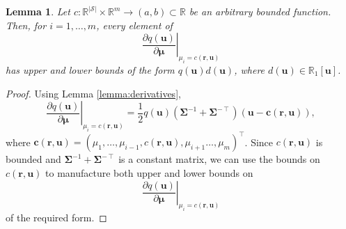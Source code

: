 \documentclass{mpaper}
\newtheorem{lemma}[theorem]{Lemma}
\begin{document}
\begin{lemma} \label{lemma:bound2}
  Let $c : \mathbb{R}^{|\mathcal{S}|} \times \mathbb{R}^m \to (a, b) \subset
  \mathbb{R}$ be an arbitrary bounded function. Then, for $i = 1, \dots, m$,
  every element of
  \[
    \left. \frac{\partial q(\mathbf{u})}{\partial \bm\mu} \right|_{\mu_i =
      c(\mathbf{r}, \mathbf{u})}
  \]
  has upper and lower bounds of the form $q(\mathbf{u})d(\mathbf{u})$,
  where $d(\mathbf{u}) \in \mathbb{R}_1[\mathbf{u}]$.
\end{lemma}
\begin{proof}
  Using Lemma \ref{lemma:derivatives},
  \[
    \left. \frac{\partial q(\mathbf{u})}{\partial \bm\mu} \right|_{\mu_i =
      c(\mathbf{r}, \mathbf{u})} = \frac{1}{2}q(\mathbf{u})(\bm\Sigma^{-1} +
    \bm\Sigma^{-\intercal})(\mathbf{u} - \mathbf{c}(\mathbf{r}, \mathbf{u})),
  \]
  where $\mathbf{c}(\mathbf{r}, \mathbf{u}) = (\mu_1, \dots, \mu_{i - 1},
  c(\mathbf{r}, \mathbf{u}), \mu_{i + 1} \dots, \mu_m)^\intercal$. Since
  $c(\mathbf{r}, \mathbf{u})$ is bounded and $\bm\Sigma^{-1} +
  \bm\Sigma^{-\intercal}$ is a constant matrix, we can use the bounds on
  $c(\mathbf{r}, \mathbf{u})$ to manufacture both upper and lower bounds on
  \[
     \left. \frac{\partial q(\mathbf{u})}{\partial \bm\mu} \right|_{\mu_i =
      c(\mathbf{r}, \mathbf{u})}
  \]
  of the required form.
\end{proof}
\end{document}
